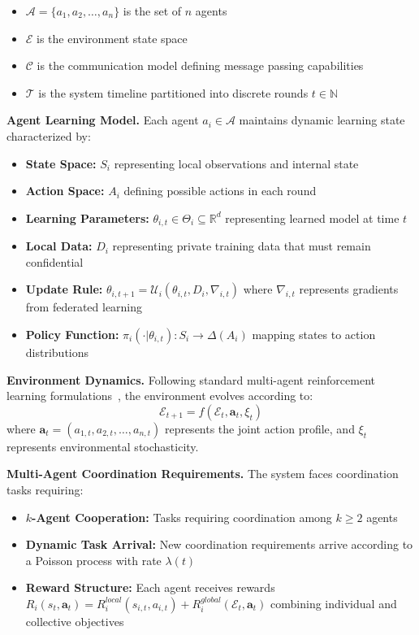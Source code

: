 \documentclass[conference]{IEEEtran}
\begin{document}
\begin{itemize}
    \item $\mathcal{A} = \{a_1, a_2, \ldots, a_n\}$ is the set of $n$ agents
    \item $\mathcal{E}$ is the environment state space
    \item $\mathcal{C}$ is the communication model defining message passing capabilities
    \item $\mathcal{T}$ is the system timeline partitioned into discrete rounds $t \in \mathbb{N}$
\end{itemize}

\textbf{Agent Learning Model.} Each agent $a_i \in \mathcal{A}$ maintains dynamic learning state characterized by:

\begin{itemize}
    \item \textbf{State Space:} $S_i$ representing local observations and internal state
    \item \textbf{Action Space:} $A_i$ defining possible actions in each round
    \item \textbf{Learning Parameters:} $\theta_{i,t} \in \Theta_i \subseteq \mathbb{R}^d$ representing learned model at time $t$
    \item \textbf{Local Data:} $D_i$ representing private training data that must remain confidential
    \item \textbf{Update Rule:} $\theta_{i,t+1} = \mathcal{U}_i(\theta_{i,t}, D_i, \nabla_{i,t})$ where $\nabla_{i,t}$ represents gradients from federated learning~\cite{mcmahan2017federated}
    \item \textbf{Policy Function:} $\pi_i(\cdot | \theta_{i,t}): S_i \rightarrow \Delta(A_i)$ mapping states to action distributions
\end{itemize}

\textbf{Environment Dynamics.} Following standard multi-agent reinforcement learning formulations~\cite{zhang2021multi}, the environment evolves according to:
$$\mathcal{E}_{t+1} = f(\mathcal{E}_t, \mathbf{a}_t, \xi_t)$$
where $\mathbf{a}_t = (a_{1,t}, a_{2,t}, \ldots, a_{n,t})$ represents the joint action profile, and $\xi_t$ represents environmental stochasticity.

\textbf{Multi-Agent Coordination Requirements.} The system faces coordination tasks requiring:
\begin{itemize}
    \item \textbf{$k$-Agent Cooperation:} Tasks requiring coordination among $k \geq 2$ agents
    \item \textbf{Dynamic Task Arrival:} New coordination requirements arrive according to a Poisson process with rate $\lambda(t)$
    \item \textbf{Reward Structure:} Each agent receives rewards $R_i(s_t, \mathbf{a}_t) = R_i^{local}(s_{i,t}, a_{i,t}) + R_i^{global}(\mathcal{E}_t, \mathbf{a}_t)$ combining individual and collective objectives
\end{itemize}
\end{document}

